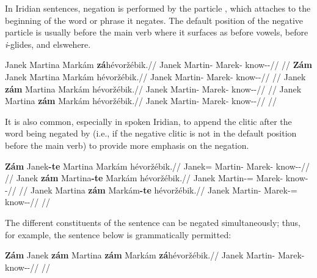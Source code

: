 In Iridian sentences, negation is performed by the particle , which attaches to the beginning of the word or phrase  it negates. The default position of the negative particle is usually before the main verb where it surfaces as  before vowels,  before \emph{i}-glides, and  elswehere.

\pex
\a
\begingl
    \gla Janek Martina Markám \textbf{zá}hévoržébik.//
    \glb Janek Martin-\Pat{} Marek-\Agt{} \Neg{}know-\Ben{}-\Pf{}//
    \glft {}//
\endgl
\a
\begingl
    \gla \textbf{Zám} Janek Martina Markám hévoržébik.//
    \glb \Neg{} Janek Martin-\Pat{} Marek-\Agt{} know-\Ben{}-\Pf{}//
    \glft {}//
\endgl
\a
\begingl
    \gla Janek \textbf{zám} Martina Markám hévoržébik.//
    \glb Janek \Neg{} Martin-\Pat{} Marek-\Agt{} know-\Ben{}-\Pf{}//
    \glft {}//
\endgl
\a
\begingl
    \gla Janek Martina \textbf{zám} Markám hévoržébik.//
    \glb Janek Martin-\Pat{} \Neg{} Marek-\Agt{} know-\Ben{}-\Pf{}//
    \glft {}//
\endgl
\xe

It is also common, especially in spoken Iridian, to append the clitic 
after the word being negated by  (i.e., if the negative clitic is not
in the default position before the main verb) to provide more emphasis on the
negation.

\pex
\a
\begingl
    \gla \textbf{Zám} Janek\textbf{-te} Martina Markám hévoržébik.//
    \glb \Neg{} Janek=\Foc{} Martin-\Pat{} Marek-\Agt{} know-\Ben{}-\Pf{}//
    \glft {}//
\endgl
\a
\begingl
    \gla Janek \textbf{zám} Martina\textbf{-te} Markám hévoržébik.//
    \glb Janek \Neg{} Martin-\Pat{}=\Foc{} Marek-\Agt{} know-\Ben{}-\Pf{}//
    \glft {}//
\endgl
\a
\begingl
    \gla Janek Martina \textbf{zám} Markám\textbf{-te} hévoržébik.//
    \glb Janek Martin-\Pat{} \Neg{} Marek-\Agt{}=\Foc{} know-\Ben{}-\Pf{}//
    \glft {}//
\endgl
\xe

The different constituents of the sentence can be negated simultaneously; thus,
for example, the sentence below is grammatically permitted:

\pex
\begingl
    \gla \textbf{Zám} Janek \textbf{zám} Martina \textbf{zám} Markám \textbf{zá}hévoržébik.//
    \glb \Neg{} Janek \Neg{} Martin-\Pat{} \Neg{} Marek-\Agt{} \Neg{}know-\Ben{}-\Pf{}//
    \glft {}//
\endgl
\xe

